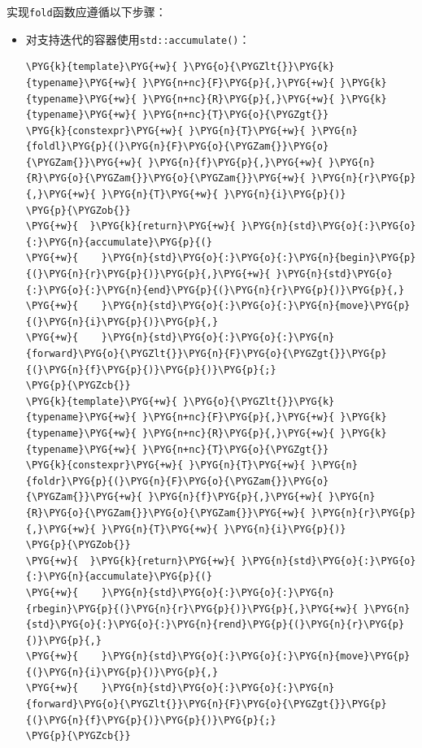 
实现\texttt{fold}函数应遵循以下步骤：



\begin{itemize}
\item 对支持迭代的容器使用\texttt{std::\allowbreak{}accumulate()}：



\begin{codeblockbg}
\begin{Verbatim}[commandchars=\\\{\},breaklines=true,breakanywhere=true,fontsize=\codefont,xleftmargin=17bp]
\PYG{k}{template}\PYG{+w}{ }\PYG{o}{\PYGZlt{}}\PYG{k}{typename}\PYG{+w}{ }\PYG{n+nc}{F}\PYG{p}{,}\PYG{+w}{ }\PYG{k}{typename}\PYG{+w}{ }\PYG{n+nc}{R}\PYG{p}{,}\PYG{+w}{ }\PYG{k}{typename}\PYG{+w}{ }\PYG{n+nc}{T}\PYG{o}{\PYGZgt{}}
\PYG{k}{constexpr}\PYG{+w}{ }\PYG{n}{T}\PYG{+w}{ }\PYG{n}{foldl}\PYG{p}{(}\PYG{n}{F}\PYG{o}{\PYGZam{}}\PYG{o}{\PYGZam{}}\PYG{+w}{ }\PYG{n}{f}\PYG{p}{,}\PYG{+w}{ }\PYG{n}{R}\PYG{o}{\PYGZam{}}\PYG{o}{\PYGZam{}}\PYG{+w}{ }\PYG{n}{r}\PYG{p}{,}\PYG{+w}{ }\PYG{n}{T}\PYG{+w}{ }\PYG{n}{i}\PYG{p}{)}
\PYG{p}{\PYGZob{}}
\PYG{+w}{  }\PYG{k}{return}\PYG{+w}{ }\PYG{n}{std}\PYG{o}{:}\PYG{o}{:}\PYG{n}{accumulate}\PYG{p}{(}
\PYG{+w}{    }\PYG{n}{std}\PYG{o}{:}\PYG{o}{:}\PYG{n}{begin}\PYG{p}{(}\PYG{n}{r}\PYG{p}{)}\PYG{p}{,}\PYG{+w}{ }\PYG{n}{std}\PYG{o}{:}\PYG{o}{:}\PYG{n}{end}\PYG{p}{(}\PYG{n}{r}\PYG{p}{)}\PYG{p}{,}
\PYG{+w}{    }\PYG{n}{std}\PYG{o}{:}\PYG{o}{:}\PYG{n}{move}\PYG{p}{(}\PYG{n}{i}\PYG{p}{)}\PYG{p}{,}
\PYG{+w}{    }\PYG{n}{std}\PYG{o}{:}\PYG{o}{:}\PYG{n}{forward}\PYG{o}{\PYGZlt{}}\PYG{n}{F}\PYG{o}{\PYGZgt{}}\PYG{p}{(}\PYG{n}{f}\PYG{p}{)}\PYG{p}{)}\PYG{p}{;}
\PYG{p}{\PYGZcb{}}
\PYG{k}{template}\PYG{+w}{ }\PYG{o}{\PYGZlt{}}\PYG{k}{typename}\PYG{+w}{ }\PYG{n+nc}{F}\PYG{p}{,}\PYG{+w}{ }\PYG{k}{typename}\PYG{+w}{ }\PYG{n+nc}{R}\PYG{p}{,}\PYG{+w}{ }\PYG{k}{typename}\PYG{+w}{ }\PYG{n+nc}{T}\PYG{o}{\PYGZgt{}}
\PYG{k}{constexpr}\PYG{+w}{ }\PYG{n}{T}\PYG{+w}{ }\PYG{n}{foldr}\PYG{p}{(}\PYG{n}{F}\PYG{o}{\PYGZam{}}\PYG{o}{\PYGZam{}}\PYG{+w}{ }\PYG{n}{f}\PYG{p}{,}\PYG{+w}{ }\PYG{n}{R}\PYG{o}{\PYGZam{}}\PYG{o}{\PYGZam{}}\PYG{+w}{ }\PYG{n}{r}\PYG{p}{,}\PYG{+w}{ }\PYG{n}{T}\PYG{+w}{ }\PYG{n}{i}\PYG{p}{)}
\PYG{p}{\PYGZob{}}
\PYG{+w}{  }\PYG{k}{return}\PYG{+w}{ }\PYG{n}{std}\PYG{o}{:}\PYG{o}{:}\PYG{n}{accumulate}\PYG{p}{(}
\PYG{+w}{    }\PYG{n}{std}\PYG{o}{:}\PYG{o}{:}\PYG{n}{rbegin}\PYG{p}{(}\PYG{n}{r}\PYG{p}{)}\PYG{p}{,}\PYG{+w}{ }\PYG{n}{std}\PYG{o}{:}\PYG{o}{:}\PYG{n}{rend}\PYG{p}{(}\PYG{n}{r}\PYG{p}{)}\PYG{p}{,}
\PYG{+w}{    }\PYG{n}{std}\PYG{o}{:}\PYG{o}{:}\PYG{n}{move}\PYG{p}{(}\PYG{n}{i}\PYG{p}{)}\PYG{p}{,}
\PYG{+w}{    }\PYG{n}{std}\PYG{o}{:}\PYG{o}{:}\PYG{n}{forward}\PYG{o}{\PYGZlt{}}\PYG{n}{F}\PYG{o}{\PYGZgt{}}\PYG{p}{(}\PYG{n}{f}\PYG{p}{)}\PYG{p}{)}\PYG{p}{;}
\PYG{p}{\PYGZcb{}}
\end{Verbatim}
\end{codeblockbg}



\end{itemize}
